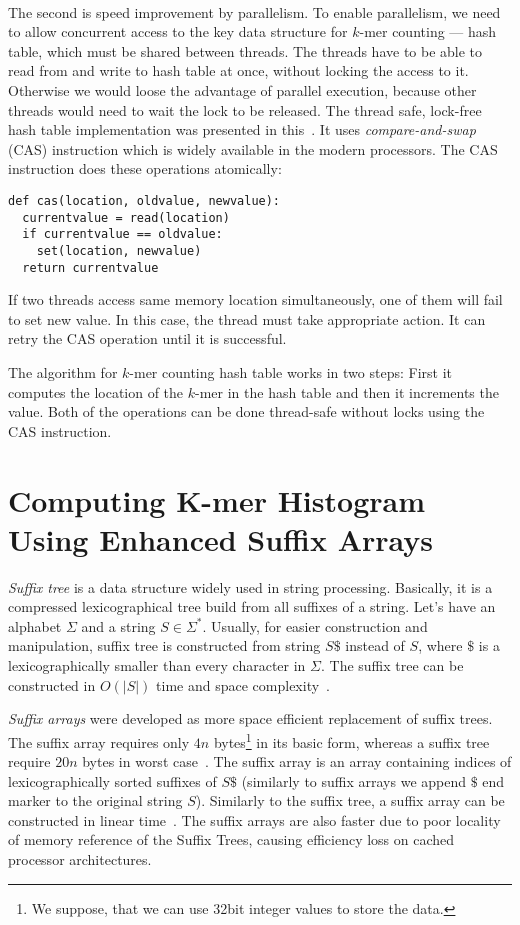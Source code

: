 \paragraph{} The second is speed improvement by parallelism. To enable parallelism, we need to allow concurrent access to the key data structure for $k$-mer counting --- hash table, which must be shared between threads. The threads have to be able to read from and write to hash table at once, without locking the access to it. Otherwise we would loose the advantage of parallel execution, because other threads would need to wait the lock to be released. The thread safe, lock-free hash table implementation was presented in this~\cite{jellyfish}. It uses \emph{compare-and-swap} (CAS) instruction which is widely available in the modern processors. The CAS instruction does these operations atomically:
\begin{lstlisting}
def cas(location, oldvalue, newvalue):
  currentvalue = read(location)
  if currentvalue == oldvalue:
    set(location, newvalue)
  return currentvalue
\end{lstlisting}
If two threads access same memory location simultaneously, one of them will fail to set new value. In this case, the thread must take appropriate action.
It can retry the CAS operation until it is successful.

The algorithm for $k$-mer counting hash table works in two steps:
First it computes the location of the $k$-mer in the hash table and then it increments the value. Both of the operations can be done thread-safe without locks using the CAS instruction.

\section[Enhanced Suffix Arrays]{Computing K-mer Histogram Using Enhanced Suffix Arrays}

\emph{Suffix tree}\cite{suffixtree} is a data structure widely used in string processing. Basically, it is a compressed lexicographical tree build from all suffixes of a string. Let's have an alphabet $\Sigma$ and a string $S \in \Sigma^*$. Usually, for easier construction and manipulation, suffix tree is constructed from string $S\$$ instead of $S$, where $\$$ is a lexicographically smaller than every character in $\Sigma$. The suffix tree can be constructed in $O(|S|)$ time and space complexity~\cite{suffixtree}.

\emph{Suffix arrays}\cite{suffixarray} were developed as more space efficient replacement of suffix trees. The suffix array requires only $4n$ bytes\footnote{We suppose, that we can use 32bit integer values to store the data.} in its basic form, whereas a suffix tree require $20n$ bytes in worst case~\cite{kurtz1999reducing}. The suffix array is an array containing indices of lexicographically sorted suffixes of $S\$$ (similarly to suffix arrays we append $\$$ end marker to the original string $S$). Similarly to the suffix tree, a suffix array can be constructed in linear time~\cite{karkkainen2003simple, kim2003linear, ko2003space}. The suffix arrays are also faster due to poor locality of memory reference of the Suffix Trees, causing efficiency loss on cached processor architectures.

